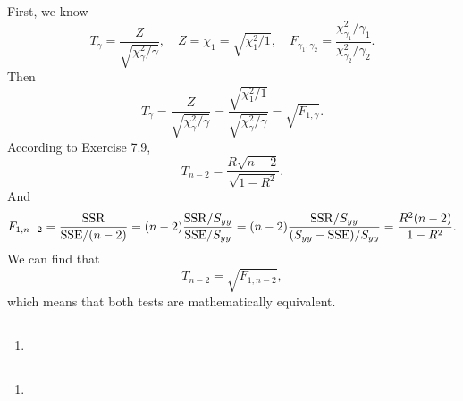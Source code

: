 \documentclass[11pt,a4paper]{article}
\author{Group 37}
\subtitle{Assignment}
\begin{document}
\maketitle

\subsection{}
First, we know
$$T_\gamma=\frac{Z}{\sqrt{\chi^2_\gamma/\gamma}},\quad Z=\chi_1=\sqrt{\chi^2_1/1},\quad F_{\gamma_1,\gamma_2}=\frac{\chi^2_{\gamma_1}/\gamma_1}{\chi^2_{\gamma_2}/\gamma_2}.$$
Then
$$T_\gamma=\frac{Z}{\sqrt{\chi^2_\gamma/\gamma}}=\frac{\sqrt{\chi^2_1/1}}{\sqrt{\chi^2_\gamma/\gamma}}=\sqrt{F_{1,\gamma}}.$$
According to Exercise 7.9,
$$T_{n-2}=\frac{R\sqrt{n-2}}{\sqrt{1-R^2}}.$$
And
$$F_{1,n-2}=\frac{\rm SSR}{{\rm SSE}/(n-2)}=(n-2)\frac{{\rm SSR}/S_{yy}}{{\rm SSE}/S_{yy}}=(n-2)\frac{{\rm SSR}/S_{yy}}{(S_{yy}-{\rm SSE})/S_{yy}}=\frac{R^2(n-2)}{1-R^2}.$$
We can find that $$T_{n-2}=\sqrt{F_{1,n-2}},$$
which means that both tests are mathematically equivalent.

\subsection{}
\begin{enumerate}[label=\roman*)]
\item

\end{enumerate}

\subsection{}
\begin{enumerate}[label=\roman*)]
\item
\end{enumerate}
\end{document}
